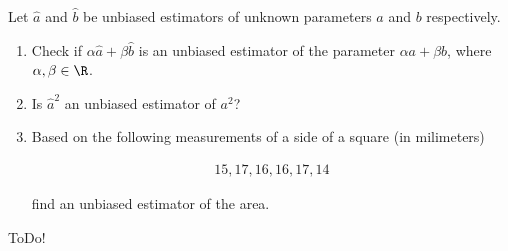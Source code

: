 
\begin{exercise}

Let $\hat a$ and $\hat b$ be unbiased estimators of unknown parameters $a$ and $b$ respectively.

\begin{enumerate}[label = (\alph*)]

    \item Check if $\alpha \hat a + \beta \hat b$ is an unbiased estimator of the parameter $\alpha a + \beta b$, where $\alpha, \beta \in \R$.

    \item Is $\hat a^2$ an unbiased estimator of $a^2$?

    \item Based on the following measurements of a side of a square (in milimeters)
    
    \begin{align*}
        15, 17, 16, 16, 17, 14
    \end{align*}

    find an unbiased estimator of the area.

\end{enumerate}

\end{exercise}


\begin{solution}

ToDo!

\end{solution}

